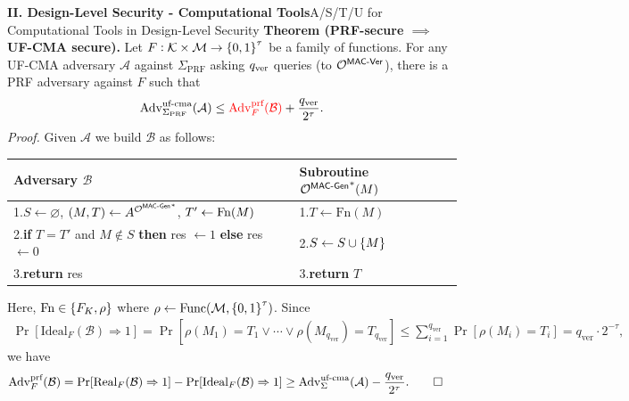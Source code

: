 \documentclass[10pt,aspectratio=1610,compress,dvipsnames]{beamer}
\begin{document}
\begin{frame}[fragile]{\bfseries II. Design-Level Security - Computational Tools}{A/S/T/U for Computational Tools in Design-Level Security}
\textbf{Theorem (PRF-secure $\implies$ UF-CMA secure).}\; Let $F:\mathcal{K}\times\mathcal{M}\to\set{0,1}^\tau$ be a family of functions. For any UF-CMA adversary $\mathcal{A}$ against $\Sigma_{\text{PRF}}$ asking $q_{\rm ver}$ queries (to $\mathcal{O}^{\mathsf{MAC}\text{-}\mathsf{Ver}}$), there is a PRF adversary against $F$ such that \[
\mathrm{Adv}_{\Sigma_{\text{PRF}}}^{\text{uf-cma}}(\mathcal{A})\leq {\color{red}\mathrm{Adv}_F^{\text{prf}}(\mathcal{B})}+\frac{q_{\rm ver}}{2^{\tau}}.
\]
\textit{Proof.}\; Given $\mathcal{A}$ we build $\mathcal{B}$ as follows:
\begin{center}
	\begin{tabular}{|l|l|}
		\hline
		\textbf{Adversary} $\mathcal{B}$ & \textbf{Subroutine} ${\mathcal{O}^{\mathsf{MAC}\text{-}\mathsf{Gen}}}^\ast(M)$
		\\ \hline
		{\color{gray}1.}\quad $S\gets\varnothing$,\; $(M,T)\gets A^{{\mathcal{O}^{\mathsf{MAC}\text{-}\mathsf{Gen}}}^\ast}$,\; $T'\gets {\rm Fn}(M)$ & 
		{\color{gray}1.}\quad $T\gets\text{Fn}(M)$ \\
		{\color{gray}2.}\quad \textbf{if} $T=T'$ and $M\notin S$ \textbf{then} res $\gets 1$ \textbf{else} res $\gets 0$ &
		{\color{gray}2.}\quad $S\gets S\cup\set{M}$\\
		{\color{gray}3.}\quad \textbf{return} res &
		{\color{gray}3.}\quad \textbf{return} $T$\\
		\hline
	\end{tabular}
\end{center}
Here, ${\rm Fn}\in\set{F_K, \rho}$ where $\rho\gets\mathrm{Func}(\mathcal{M},\set{0,1}^\tau)$. Since \begin{align*}
	\Pr[\text{Ideal$_F$}(\mathcal{B})\Rightarrow 1]
	=\Pr[\rho(M_1)=T_1\lor\cdots\lor \rho(M_{q_{\text{ver}}})=T_{q_{\text{ver}}} ]\leq\sum_{i=1}^{q_{\text{ver}}}\Pr[\rho(M_i)=T_i]= q_{\text{ver}}\cdot 2^{-\tau},
\end{align*} we have \begin{align*}
\Adv_F^{\text{prf}}(\mathcal{B}) &=\Pr[\text{Real$_F$}(\mathcal{B})\Rightarrow 1]-\Pr[\text{Ideal$_F$}(\mathcal{B})\Rightarrow 1]\geq \Adv_{\Sigma}^{\text{uf-cma}}(\mathcal{A})-\frac{q_{\text{ver}}}{2^\tau}.\hfill\qed
\end{align*}
\end{frame}
\end{document}
